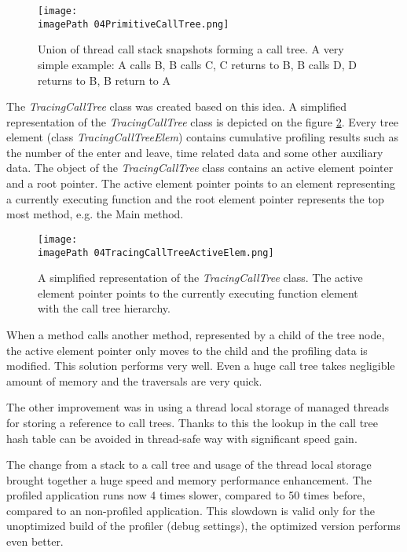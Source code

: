\begin{figure}
	\centering
		\texttt{[image: \\imagePath 04PrimitiveCallTree.png]}
		\caption{ Union of thread call stack snapshots forming a call tree. A very simple example: A calls  B, B calls C, C returns to B, B calls D, D returns to B, B return to A }
	\label{fig:04PrimitiveCallTree}
\end{figure}

The \textit{TracingCallTree} class was created based on this idea.
A simplified representation of the \textit{TracingCallTree} class is depicted on the figure \ref{fig:04TracingCallTreeActiveElem}. Every tree element (class \textit{TracingCallTreeElem}) contains cumulative profiling results such as the number of the enter and leave, time related data and some other auxiliary data. The object of the \textit{TracingCallTree} class contains an active element pointer and a root pointer. The active element pointer points to an element representing a currently executing function and the root element pointer represents the top most method, e.g. the Main method. 


\begin{figure}
	\centering
		\texttt{[image: \\imagePath 04TracingCallTreeActiveElem.png]}
		\caption{A simplified representation of the \textit{TracingCallTree} class. The active element pointer points to the currently executing function element with the call tree hierarchy. }
	\label{fig:04TracingCallTreeActiveElem}
\end{figure}


When a method calls another method, represented by a child of the tree node, the active element pointer only moves to the child and the profiling data is modified. This solution performs very well. Even a huge call tree takes negligible amount of memory and the traversals are very quick. 

The other improvement was in using a thread local storage of managed threads for storing a reference to call trees. Thanks to this the lookup in the call tree hash table can be avoided in thread-safe way with significant speed gain. 

The change from a stack to a call tree and usage of the thread local storage brought together a huge speed and memory performance enhancement. The profiled application runs now 4 times slower, compared to 50 times before, compared to an non-profiled application. This slowdown is valid only for the unoptimized build of the profiler (debug settings), the optimized version performs even better. 

